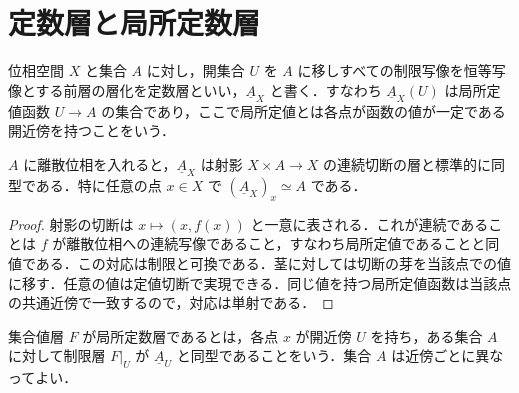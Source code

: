 \section{定数層と局所定数層}
\begin{defn}[定数層]
位相空間 $X$ と集合 $A$ に対し，開集合 $U$ を $A$ に移しすべての制限写像を恒等写像とする前層の層化を定数層といい，$\underline A_X$ と書く．すなわち $\underline A_X(U)$ は局所定値函数 $U\to A$ の集合であり，ここで局所定値とは各点が函数の値が一定である開近傍を持つことをいう．
\end{defn}
\begin{prop}[定数層と離散ファイバー]
$A$ に離散位相を入れると，$\underline A_X$ は射影 $X\times A\to X$ の連続切断の層と標準的に同型である．特に任意の点 $x\in X$ で $(\underline A_X)_x\simeq A$ である．
\end{prop}
\begin{proof}
射影の切断は $x\mapsto(x,f(x))$ と一意に表される．これが連続であることは $f$ が離散位相への連続写像であること，すなわち局所定値であることと同値である．この対応は制限と可換である．茎に対しては切断の芽を当該点での値に移す．任意の値は定値切断で実現できる．同じ値を持つ局所定値函数は当該点の共通近傍で一致するので，対応は単射である．
\end{proof}
\begin{defn}[局所定数層]
集合値層 $F$ が局所定数層であるとは，各点 $x$ が開近傍 $U$ を持ち，ある集合 $A$ に対して制限層 $F|_U$ が $\underline A_U$ と同型であることをいう．集合 $A$ は近傍ごとに異なってよい．
\end{defn}
